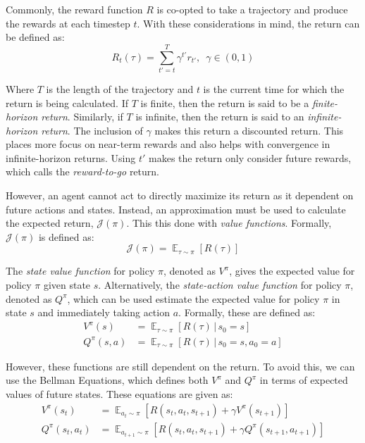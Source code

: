 \documentclass[conference]{IEEEtran}
\begin{document}
Commonly, the reward function $R$ is co-opted to take a trajectory and produce the rewards at each timestep $t$. With these considerations in mind, the return can be defined as:
$$
    R_t(\tau) = \sum_{t'=t}^T \gamma^{t'} r_{t'}, \enspace \gamma \in (0, 1)
$$

Where $T$ is the length of the trajectory and $t$ is the current time for which the return is being calculated. If $T$ is finite, then the return is said to be a \textit{finite-horizon return}. Similarly, if $T$ is infinite, then the return is said to an \textit{infinite-horizon return}. The inclusion of $\gamma$ makes this return a discounted return. This places more focus on near-term rewards and also helps with convergence in infinite-horizon returns. Using $t'$ makes the return only consider future rewards, which \cite{spinning_up_policy_optimization} calls the \textit{reward-to-go} return.

However, an agent cannot act to directly maximize its return as it dependent on future actions and states. Instead, an approximation must be used to calculate the expected return, $\mathcal{J}(\pi)$. This this done with \textit{value functions}. Formally, $\mathcal{J}(\pi)$ is defined as:
$$
    \mathcal{J}(\pi) = \mathop{\mathbb{E}}_{\tau \sim \pi}[R(\tau)]
$$

The \textit{state value function} for policy $\pi$, denoted as $V^\pi$, gives the expected value for policy $\pi$ given state $s$. Alternatively, the \textit{state-action value function} for policy $\pi$, denoted as $Q^\pi$, which can be used estimate the expected value for policy $\pi$ in state $s$ and immediately taking action $a$. Formally, these are defined as:
\begin{align*}
    V^\pi(s)    & = \mathop{\mathbb{E}}_{\tau \sim \pi}[R(\tau) \, | \, s_0 = s]          \\
    Q^\pi(s, a) & = \mathop{\mathbb{E}}_{\tau \sim \pi}[R(\tau) \, | \, s_0 = s, a_0 = a]
\end{align*}

However, these functions are still dependent on the return. To avoid this, we can use the Bellman Equations, which defines both $V^\pi$ and $Q^\pi$ in terms of expected values of future states. \cite{deep_rl_survey, spinning_up_intro, sutton2018reinforcement} These equations are given as:
\begin{align*}
    V^\pi(s_t)      & = \mathop{\mathbb{E}}_{a_t \sim \pi} [ R(s_t, a_t, s_{t+1}) + \gamma V^\pi(s_{t+1})]              \\
    Q^\pi(s_t, a_t) & = \mathop{\mathbb{E}}_{a_{t+1} \sim \pi} [ R(s_t, a_t, s_{t+1}) + \gamma Q^\pi(s_{t+1}, a_{t+1})]
\end{align*}
\end{document}

